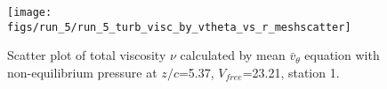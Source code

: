 \begin{figure}[H]
\centering
\texttt{[image: figs/run\_5/run\_5\_turb\_visc\_by\_vtheta\_vs\_r\_meshscatter]}
\caption{Scatter plot of total viscosity $\nu$ calculated by mean $\bar{v}_{\theta}$ equation with non-equilibrium pressure at $z/c$=5.37, $V_{free}$=23.21, station 1.}
\label{fig:run_5_turb_visc_by_vtheta_vs_r_meshscatter}
\end{figure}


